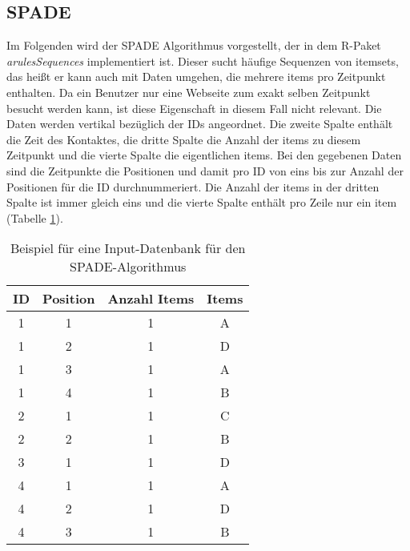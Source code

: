 \subsection{SPADE}
Im Folgenden wird der SPADE Algorithmus \cite{spade} vorgestellt, der in dem R-Paket \textit{arulesSequences} \cite{arulesSequences} implementiert ist. Dieser sucht häufige Sequenzen von itemsets, das heißt er kann auch mit Daten umgehen, die mehrere items pro Zeitpunkt enthalten. Da ein Benutzer nur eine Webseite zum exakt selben Zeitpunkt besucht werden kann, ist diese Eigenschaft in diesem Fall nicht relevant. Die Daten werden vertikal bezüglich der IDs angeordnet. Die zweite Spalte enthält die Zeit des Kontaktes, die dritte Spalte die Anzahl der items zu diesem Zeitpunkt und die vierte Spalte die eigentlichen items. Bei den gegebenen Daten sind die Zeitpunkte die Positionen und damit pro ID von eins bis zur Anzahl der Positionen für die ID durchnummeriert. Die Anzahl der items in der dritten Spalte ist immer gleich eins und die vierte Spalte enthält pro Zeile nur ein item (Tabelle \ref{input}).\\
\begin{table}[hbt]\label{input}
\centering
\begin{tabular}{c|c|c|c}
ID & Position  & Anzahl Items & Items \\ \hline
1  & 1				 & 1						& A \\
1  & 2				 & 1						& D \\
1  & 3				 & 1						& A \\
1  & 4				 & 1						& B \\
2  & 1				 & 1						& C \\
2  & 2				 & 1						& B \\
3  & 1				 & 1						& D \\
4  & 1				 & 1						& A \\
4  & 2				 & 1						& D \\
4  & 3				 & 1						& B \\
\end{tabular}
\caption{Beispiel für eine Input-Datenbank für den SPADE-Algorithmus}
\end{table}



